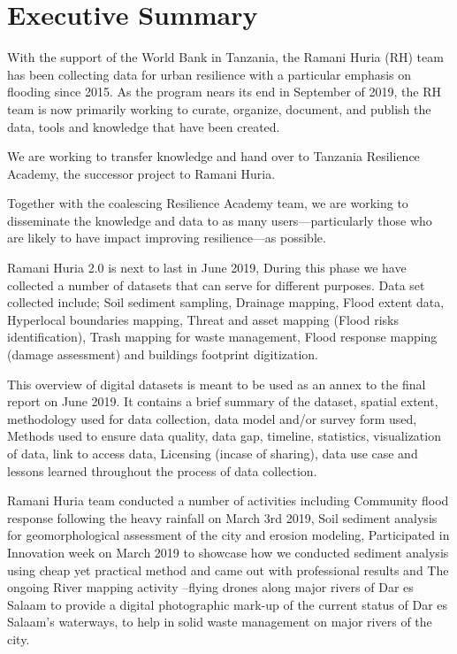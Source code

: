 \documentclass[a4paper,12pt,twoside]{article}
\begin{document}
\newpage

\tableofcontents
\newpage
\section{Executive Summary}
\label{executivesummary}
\begin{multicols}{2}

 
    
With the support of the World Bank in Tanzania, the Ramani Huria (RH) team has been collecting data for urban resilience with a particular emphasis on flooding since 2015. As the program nears its end in September of 2019, the RH team is now primarily working to curate, organize, document, and publish the data, tools and knowledge that have been created. 

We are working to transfer knowledge and hand over to Tanzania Resilience Academy, the successor project to Ramani Huria. 


Together with the coalescing Resilience Academy team, we are working to disseminate the knowledge and data to as many users---particularly those who are likely to have impact improving resilience---as possible. 


Ramani Huria 2.0 is next to last in June 2019, During this phase we have collected a number of datasets that can serve for different purposes. 
Data set collected include; Soil sediment sampling, Drainage mapping, Flood extent data, Hyperlocal boundaries mapping, Threat and asset mapping (Flood risks identification), Trash mapping for waste management, Flood response mapping (damage assessment) and buildings footprint digitization.

This overview of digital datasets is meant to be used as an annex to the final report on June 2019. It contains a brief summary of the dataset, spatial extent, methodology used for data collection, data model and/or survey form used, Methods used to ensure data quality, data gap, timeline, statistics, visualization of data, link to access data, Licensing (incase of sharing), data use case and lessons learned throughout the process of data collection.

Ramani Huria team conducted a number of activities including Community flood response following the heavy rainfall on March 3rd 2019, Soil sediment analysis for geomorphological assessment of the city and erosion modeling, Participated in Innovation week on March 2019 to showcase how we conducted sediment analysis using cheap yet practical method and came out with professional results and The ongoing River mapping activity --flying drones along major rivers of Dar es Salaam to  provide a digital photographic mark-up of the current status of Dar es Salaam’s waterways, to help in solid waste management on major rivers of the city.


\end{multicols}
\end{document}

